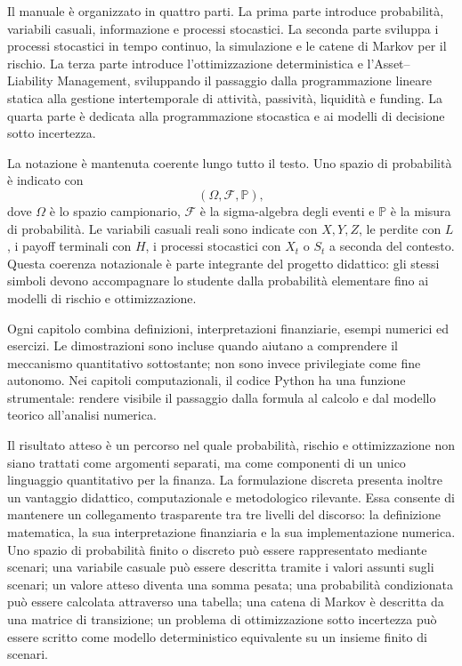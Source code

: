 \documentclass[oneside,openany]{memoir}%
\newcommand{\1}{\mathbf{1}}
\begin{document}
Il manuale \`{e} organizzato in quattro parti. La prima parte introduce
probabilit\`{a}, variabili casuali, informazione e processi stocastici. La
seconda parte sviluppa i processi stocastici in tempo continuo, la
simulazione e le catene di Markov per il rischio. La terza parte introduce l'ottimizzazione deterministica e
l'Asset--Liability Management, sviluppando il passaggio dalla programmazione
lineare statica alla gestione intertemporale di attivit\`a, passivit\`a,
liquidit\`a e funding. La quarta parte \`e dedicata alla programmazione
stocastica e ai modelli di decisione sotto incertezza.

La notazione \`{e} mantenuta coerente lungo tutto il testo. Uno spazio di
probabilit\`{a} \`{e} indicato con
\[
(\Omega,\mathcal{F},\mathbb{P}),
\]
dove $\Omega$ \`{e} lo spazio campionario, $\mathcal{F}$ \`{e} la
sigma-algebra degli eventi e $\mathbb{P}$ \`{e} la misura di probabilit\`{a}.
Le variabili casuali reali sono indicate con $X,Y,Z$, le perdite con $L$, i
payoff terminali con $H$, i processi stocastici con $X_{t}$ o $S_{t}$ a
seconda del contesto. Questa coerenza notazionale \`{e} parte integrante del
progetto didattico: gli stessi simboli devono accompagnare lo studente dalla
probabilit\`{a} elementare fino ai modelli di rischio e ottimizzazione.

Ogni capitolo combina definizioni, interpretazioni finanziarie, esempi
numerici ed esercizi. Le dimostrazioni sono incluse quando aiutano a
comprendere il meccanismo quantitativo sottostante; non sono invece
privilegiate come fine autonomo. Nei capitoli computazionali, il codice Python
ha una funzione strumentale: rendere visibile il passaggio dalla formula al
calcolo e dal modello teorico all'analisi numerica.

Il risultato atteso \`{e} un percorso nel quale probabilit\`{a}, rischio e
ottimizzazione non siano trattati come argomenti separati, ma come componenti
di un unico linguaggio quantitativo per la finanza. La formulazione discreta
presenta inoltre un vantaggio didattico, computazionale e metodologico
rilevante. Essa consente di mantenere un collegamento trasparente tra tre
livelli del discorso: la definizione matematica, la sua interpretazione
finanziaria e la sua implementazione numerica. Uno spazio di probabilit\`{a}
finito o discreto pu\`{o} essere rappresentato mediante scenari; una variabile
casuale pu\`{o} essere descritta tramite i valori assunti sugli scenari; un
valore atteso diventa una somma pesata; una probabilit\`{a} condizionata
pu\`{o} essere calcolata attraverso una tabella; una catena di Markov \`{e}
descritta da una matrice di transizione; un problema di ottimizzazione sotto
incertezza pu\`{o} essere scritto come modello deterministico equivalente su
un insieme finito di scenari.
\end{document}
